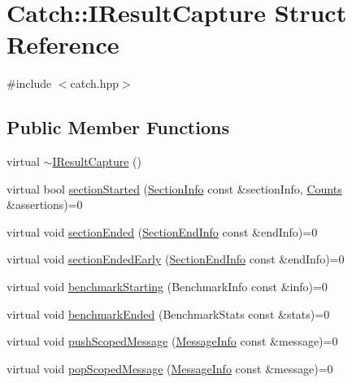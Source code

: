 \hypertarget{struct_catch_1_1_i_result_capture}{}\section{Catch\+:\+:I\+Result\+Capture Struct Reference}
\label{struct_catch_1_1_i_result_capture}


{\ttfamily \#include $<$catch.\+hpp$>$}

\subsection*{Public Member Functions}
\begin{DoxyCompactItemize}
\item 
virtual \mbox{\hyperlink{struct_catch_1_1_i_result_capture_a3bd16719d6772b7470887fc36c6d0808}{$\sim$\+I\+Result\+Capture}} ()
\item 
virtual bool \mbox{\hyperlink{struct_catch_1_1_i_result_capture_a5b76ed52badcb64cf374202e12b81a03}{section\+Started}} (\mbox{\hyperlink{struct_catch_1_1_section_info}{Section\+Info}} const \&section\+Info, \mbox{\hyperlink{struct_catch_1_1_counts}{Counts}} \&assertions)=0
\item 
virtual void \mbox{\hyperlink{struct_catch_1_1_i_result_capture_a4e152bc43dc0933684e31fa67a58195d}{section\+Ended}} (\mbox{\hyperlink{struct_catch_1_1_section_end_info}{Section\+End\+Info}} const \&end\+Info)=0
\item 
virtual void \mbox{\hyperlink{struct_catch_1_1_i_result_capture_afcc71eef8ca821ae132cced4a2be6988}{section\+Ended\+Early}} (\mbox{\hyperlink{struct_catch_1_1_section_end_info}{Section\+End\+Info}} const \&end\+Info)=0
\item 
virtual void \mbox{\hyperlink{struct_catch_1_1_i_result_capture_a264ae12330c74b2daae41715a30d51bf}{benchmark\+Starting}} (Benchmark\+Info const \&info)=0
\item 
virtual void \mbox{\hyperlink{struct_catch_1_1_i_result_capture_a6e5e64f9d94211a888249012ab6cc7fb}{benchmark\+Ended}} (Benchmark\+Stats const \&stats)=0
\item 
virtual void \mbox{\hyperlink{struct_catch_1_1_i_result_capture_a91d154c1e087e383dcde5aad95cb6a05}{push\+Scoped\+Message}} (\mbox{\hyperlink{struct_catch_1_1_message_info}{Message\+Info}} const \&message)=0
\item 
virtual void \mbox{\hyperlink{struct_catch_1_1_i_result_capture_a42bcb13276706bf8c3ce081ce16d37fd}{pop\+Scoped\+Message}} (\mbox{\hyperlink{struct_catch_1_1_message_info}{Message\+Info}} const \&message)=0

\end{DoxyCompactItemize}
